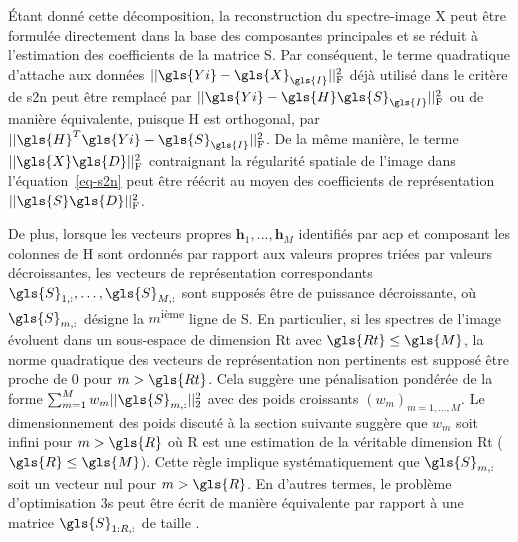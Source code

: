 \'Etant donné cette décomposition, la reconstruction du spectre-image \gls{X} peut être formulée directement dans la base des composantes principales et se réduit à l'estimation des  coefficients de la matrice \gls{S}. Par conséquent, le terme quadratique d'attache aux données $\frobnorm{\gls{Yi} - \gls{X}_{\gls{I}}}$ déjà utilisé dans le critère de \gls{s2n} peut être remplacé par $\frobnorm{\gls{Yi} - \gls{H}\gls{S}_{\gls{I}}}$ ou de manière équivalente, puisque \gls{H} est orthogonal, par $\frobnorm{\gls{H}^T\gls{Yi} - \gls{S}_{\gls{I}}}$. De la même manière, le terme $\frobnorm{\gls{X}\gls{D}}$ contraignant la régularité spatiale de l'image dans l'équation~\eqref{eq-s2n} peut être réécrit au moyen des coefficients de représentation $\frobnorm{\gls{S}\gls{D}}$.

De plus, lorsque les vecteurs propres $\mathbf{h}_1,\dots,\mathbf{h}_M$ identifiés par \gls{acp} et composant les colonnes de \gls{H} sont ordonnés par rapport aux valeurs propres triées par valeurs décroissantes, les vecteurs de représentation correspondants $\gls{S}_{1, :},\dots,\gls{S}_{M, :}$ sont supposés être de puissance décroissante, où $\gls{S}_{m, :}$ désigne la $m$\textsuperscript{ième} ligne de \gls{S}. En particulier, si les spectres de l'image évoluent dans un sous-espace de dimension \gls{Rt} avec $\gls{Rt}\leq\gls{M}$, la norme quadratique des vecteurs de représentation non pertinents est supposé être proche de 0 pour $m>\gls{Rt}$. Cela suggère une pénalisation pondérée de la forme $\sum_{m=1}^{M}w_m||\gls{S}_{m, :}||_2^2$ avec des poids croissants $(w_m)_{m=1,\dots,M}$.
%
Le dimensionnement des poids discuté à la section suivante suggère que $w_m$ soit infini pour $m>\gls{R}$ où \gls{R} est une estimation de la véritable dimension \gls{Rt} ($\gls{R}\leq\gls{M}$). Cette règle implique systématiquement que $\gls{S}_{m, :}$ soit un vecteur nul pour $m> \gls{R}$. En d'autres termes, le problème d'optimisation \gls{3s} peut être écrit de manière équivalente par rapport à une matrice $\gls{S}_{1:R, :}$ de taille .

